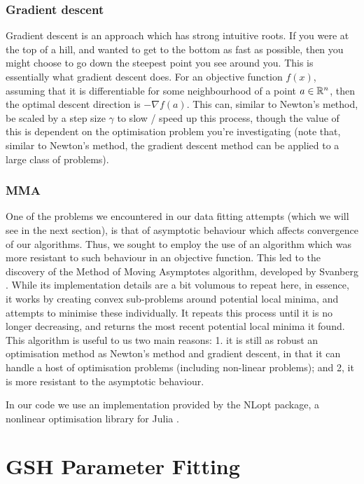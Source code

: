 \subsubsection{Gradient descent}
Gradient descent is an approach which has strong intuitive roots. If you were at the top of a hill, and wanted to get 
to the bottom as fast as possible, then you might choose to go down the steepest point you see around you. This is 
essentially what gradient descent does. For an objective function $f(x)$, assuming that it is differentiable 
for some neighbourhood of a point $a \in \mathbb{R}^n$, then the optimal descent direction is $- \nabla f(a)$. This can, 
similar to Newton's method, be scaled by a step size $\gamma$ to slow / speed up this process, though the value of 
this is dependent on the optimisation problem you're investigating (note that, similar to Newton's method, 
the gradient descent method can be applied to a large class of problems).

\subsubsection{MMA}
One of the problems we encountered in our data fitting attempts (which we will see in the next section), is that 
of asymptotic behaviour which affects convergence of our algorithms. Thus, we sought to employ the use of an algorithm 
which was more resistant to such behaviour in an objective function. This led to the discovery of the Method of Moving 
Asymptotes algorithm, developed 
by Svanberg \cite{mma}. While its implementation details are a bit volumous to repeat here, in essence, it works by creating 
convex sub-problems around potential local minima, and attempts to minimise these individually. It repeats this process until 
it is no longer decreasing, and returns the most recent potential local minima it found. This algorithm is 
useful to us two main reasons: 1. it is still as robust an optimisation method as Newton's method and gradient descent, in that it 
can handle a host of optimisation problems (including non-linear problems); and 2, it is more resistant to the asymptotic behaviour.

In our code we use an implementation provided by the NLopt package, a nonlinear optimisation library for Julia \cite{nlopt}.

\section{GSH Parameter Fitting}

